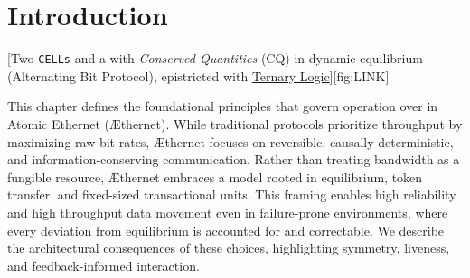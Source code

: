 \documentclass[../../../OAE-SPEC-MAIN.tex]{subfiles}
\begin{document}
\section{Introduction}

 [Two \texttt{CELLs} and a  \LINK with \emph{Conserved Quantities} (CQ) in dynamic equilibrium (Alternating Bit Protocol), epistricted with \href{https://en.wikipedia.org/wiki/Three-valued_logic}{Ternary Logic}][fig:LINK]


This chapter defines the foundational principles that govern operation over \LINKs in Atomic Ethernet (\AE thernet). While traditional protocols prioritize throughput by maximizing raw bit rates, \AE thernet focuses on reversible, causally deterministic, and information-conserving communication. Rather than treating bandwidth as a fungible resource, \AE thernet embraces a model rooted in equilibrium, token transfer, and fixed-sized transactional units. This framing enables high reliability and high throughput data movement even in failure-prone environments, where every deviation from equilibrium is accounted for and correctable. We describe the architectural consequences of these choices, highlighting symmetry, liveness, and feedback-informed interaction.
\end{document}
